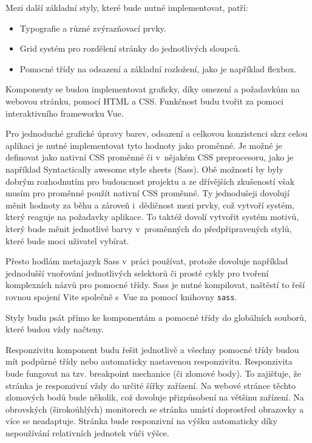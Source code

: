 Mezi další základní styly, které bude nutné implementovat, patří:

\begin{itemize}
    \item Typografie a různé zvýrazňovací prvky.
    \item Grid systém pro rozdělení stránky do jednotlivých sloupců.
    \item Pomocné třídy na odsazení a základní rozložení, jako je například flexbox.
\end{itemize}

Komponenty se budou implementovat graficky, díky omezení a požadavkům na webovou stránku, pomocí HTML a CSS.
Funkčnost budu tvořit za pomoci interaktivního frameworku Vue.

Pro jednoduché grafické úpravy barev, odsazení a celkovou konzistenci skrz celou aplikaci je nutné implementovat tyto hodnoty jako proměnné.
Je možné je definovat jako nativní CSS proměnné či v~nějakém CSS preprocesoru, jako je například Syntactically awesome style sheets (Sass).
Obě možnosti by byly dobrým rozhodnutím pro budoucnost projektu a ze dřívějších zkušeností však musím pro proměnné použít nativní CSS proměnné.
Ty jednodušeji dovolují měnit hodnoty za běhu a zároveň i~dědičnost mezi prvky, což vytvoří systém, který reaguje na požadavky aplikace.
To taktéž dovolí vytvořit systém motivů, který bude měnit jednotlivé barvy v~proměnných do předpřipravených stylů, které bude moci uživatel vybírat.

Přesto hodlám metajazyk Sass v~práci používat, protože dovoluje například jednodušší vnořování jednotlivých selektorů či prosté cykly pro tvoření komplexních názvů pro pomocné třídy.
Sass je nutné kompilovat, naštěstí to řeší rovnou spojení Vite společně s~Vue za pomocí knihovny \texttt{sass}.

Styly budu psát přímo ke komponentám a pomocné třídy do globálních souborů, které budou vždy načteny.

Responzivitu komponent budu řešit jednotlivě a všechny pomocné třídy budou mít podpůrné třídy nebo automaticky nastavenou responzivitu.
Responzivita bude fungovat na tzv. breakpoint mechanice (či zlomové body).
To zajišťuje, že stránka je responzivní vždy do určité šířky zařízení.
Na webové stránce těchto zlomových bodů bude několik, což dovoluje přizpůsobení na většinu zařízení.
Na obrovských (širokoúhlých) monitorech se stránka umístí doprostřed obrazovky a více se neadaptuje.
Stránka bude responzivní na výšku automaticky díky nepoužívání relativních jednotek vůči výšce.

